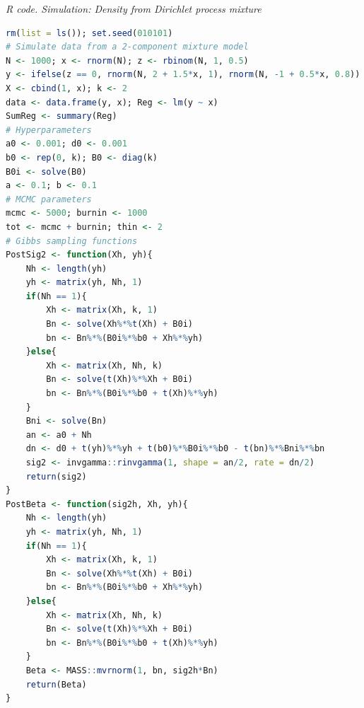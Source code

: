 \begin{enumerate}[leftmargin=*]
\begin{tcolorbox}[enhanced,width=4.67in,center upper,
	fontupper=\large\bfseries,drop shadow southwest,sharp corners]
	\textit{R code. Simulation: Density from Dirichlet process mixture}
	\begin{VF}
		\begin{lstlisting}[language=R]
rm(list = ls()); set.seed(010101)
# Simulate data from a 2-component mixture model
N <- 1000; x <- rnorm(N); z <- rbinom(N, 1, 0.5)
y <- ifelse(z == 0, rnorm(N, 2 + 1.5*x, 1), rnorm(N, -1 + 0.5*x, 0.8))
X <- cbind(1, x); k <- 2
data <- data.frame(y, x); Reg <- lm(y ~ x)
SumReg <- summary(Reg)
# Hyperparameters
a0 <- 0.001; d0 <- 0.001
b0 <- rep(0, k); B0 <- diag(k)
B0i <- solve(B0)
a <- 0.1; b <- 0.1
# MCMC parameters
mcmc <- 5000; burnin <- 1000
tot <- mcmc + burnin; thin <- 2
# Gibbs sampling functions
PostSig2 <- function(Xh, yh){
	Nh <- length(yh)
	yh <- matrix(yh, Nh, 1)
	if(Nh == 1){
		Xh <- matrix(Xh, k, 1)
		Bn <- solve(Xh%*%t(Xh) + B0i)
		bn <- Bn%*%(B0i%*%b0 + Xh%*%yh)
	}else{
		Xh <- matrix(Xh, Nh, k)
		Bn <- solve(t(Xh)%*%Xh + B0i)
		bn <- Bn%*%(B0i%*%b0 + t(Xh)%*%yh)
	}
	Bni <- solve(Bn)
	an <- a0 + Nh
	dn <- d0 + t(yh)%*%yh + t(b0)%*%B0i%*%b0 - t(bn)%*%Bni%*%bn 
	sig2 <- invgamma::rinvgamma(1, shape = an/2, rate = dn/2)
	return(sig2)
}
PostBeta <- function(sig2h, Xh, yh){
	Nh <- length(yh)
	yh <- matrix(yh, Nh, 1)
	if(Nh == 1){
		Xh <- matrix(Xh, k, 1)
		Bn <- solve(Xh%*%t(Xh) + B0i)
		bn <- Bn%*%(B0i%*%b0 + Xh%*%yh)
	}else{
		Xh <- matrix(Xh, Nh, k)
		Bn <- solve(t(Xh)%*%Xh + B0i)
		bn <- Bn%*%(B0i%*%b0 + t(Xh)%*%yh)
	}
	Beta <- MASS::mvrnorm(1, bn, sig2h*Bn)
	return(Beta)
}
\end{lstlisting}
	\end{VF}
\end{tcolorbox}



\end{enumerate}
